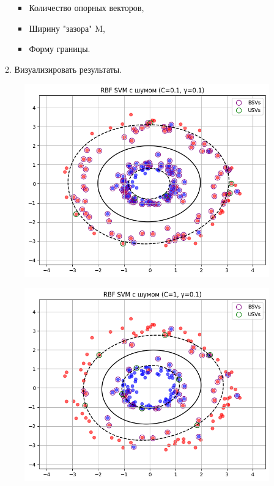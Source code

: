 \begin{enumerate}
\begin{enumerate}
    \begin{itemize}
        \item Количество опорных векторов,
        \item Ширину "зазора" M,
        \item Форму границы.
    \end{itemize}
    \item Визуализировать результаты.
\end{enumerate}
    \begin{figure}[H]
        \centering
        \includegraphics[width=0.75\linewidth]{assets/4.1.png}
        \caption {}
    \end{figure}
    \begin{figure}[H]
        \centering
        \includegraphics[width=0.75\linewidth]{assets/4.2.png}
        \caption {}
    \end{figure}
    \begin{figure}[H]

\end{figure}
\end{enumerate}
